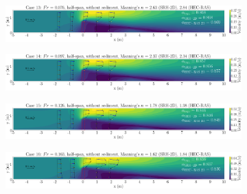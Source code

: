 \documentclass[preview, border=2pt]{standalone}
\begin{document}
\begin{figure}
     \centering
     \begin{subfigure}[b]{0.95\textwidth}
         \centering
         \caption{}
         \includegraphics[width=\textwidth]{exp_vel_mag_contour_ManningN_0013.png}
     \end{subfigure}
     \hfill     
     \begin{subfigure}[b]{0.95\textwidth}
         \centering
         \caption{}
         \includegraphics[width=\textwidth]{exp_vel_mag_contour_ManningN_0014.png}
     \end{subfigure}
     \hfill     
     \begin{subfigure}[b]{0.95\textwidth}
         \centering
         \caption{}
         \includegraphics[width=\textwidth]{exp_vel_mag_contour_ManningN_0015.png}
     \end{subfigure}
     \hfill     
     \begin{subfigure}[b]{0.95\textwidth}
         \centering
         \caption{}
         \includegraphics[width=\textwidth]{exp_vel_mag_contour_ManningN_0016.png}
     \end{subfigure}     
\end{figure}
\end{document}
